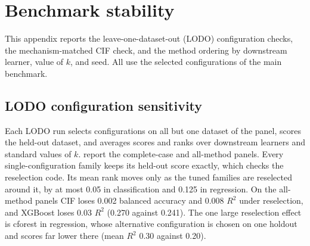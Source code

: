 \section{Benchmark stability}
\label{app:benchmark-stability}

This appendix reports the leave-one-dataset-out (LODO) configuration checks,
the mechanism-matched CIF check, and the method ordering by downstream learner,
value of $k$, and seed. All use the selected configurations of the main
benchmark.

\subsection{LODO configuration sensitivity}

Each LODO run selects configurations on all but one dataset of the panel,
scores the held-out dataset, and averages scores and ranks over downstream
learners and standard values of $k$.
 report
the complete-case and all-method panels. Every single-configuration family
keeps its held-out score exactly, which checks the reselection code. Its mean
rank moves only as the tuned families are reselected around it, by at most 0.05
in classification and 0.125 in regression. On the all-method panels CIF loses
0.002 balanced accuracy and 0.008 $R^2$ under reselection, and XGBoost loses
0.03 $R^2$ (0.270 against 0.241). The one large reselection effect is cforest
in regression, whose alternative configuration is chosen on one holdout and
scores far lower there (mean $R^2$ 0.30 against 0.20).

